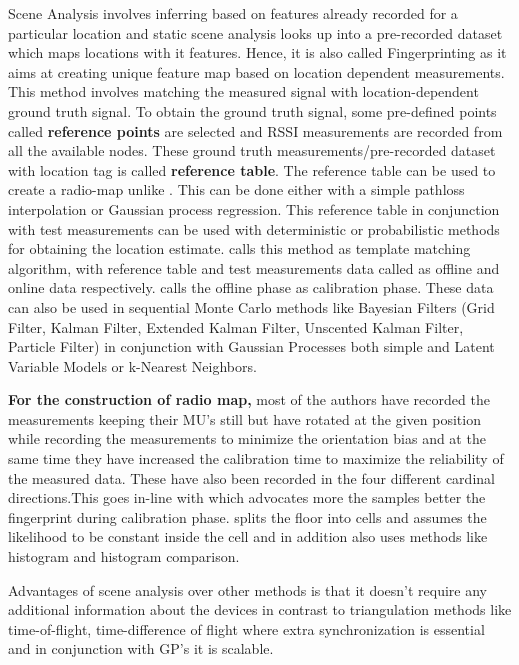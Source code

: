 Scene Analysis involves inferring based on features already recorded for a particular location and static scene analysis looks up into a pre-recorded dataset which maps locations with it features\cite{hightower}. Hence, it is also called Fingerprinting as it aims at creating unique feature map based on location dependent measurements. This method involves matching the measured signal with location-dependent ground truth signal. To obtain the ground truth signal, some pre-defined points called \textbf{reference points}  are selected and RSSI measurements are recorded from all the available nodes. These ground truth measurements/pre-recorded dataset with location tag is called \textbf{reference table}. The reference table can be used to create a radio-map unlike \cite{honkavirta}. This can be done either with a simple pathloss interpolation or Gaussian process regression.  This reference table in conjunction with test measurements can be used with deterministic or probabilistic methods for obtaining the location estimate\cite{liu}. \cite{mazzullah} calls this method as template matching algorithm, with reference table and test measurements data called as offline and online data respectively. \cite{honkavirta} calls the offline phase as calibration phase. These data can also be used in sequential Monte Carlo methods like Bayesian Filters (Grid Filter, Kalman Filter, Extended Kalman Filter, Unscented Kalman Filter, Particle Filter) in conjunction with Gaussian Processes both simple and Latent Variable Models or k-Nearest Neighbors.

\vspace{3mm}
\noindent \textbf{For the construction of radio map,} most of the authors have recorded the measurements keeping their MU's still but \cite{honkavirta} have rotated at the given position while recording the measurements to minimize the orientation bias and at the same time they have increased the calibration time to maximize the reliability of the measured data\cite{??}. These have also been recorded in the four different cardinal directions\cite{richter}.This goes in-line with \cite{??} which advocates more the samples better the fingerprint during calibration phase. \cite{honkavirta} splits the floor into cells and assumes the likelihood to be constant inside the cell and in addition also uses methods like histogram and histogram comparison.
\noindent

Advantages of scene analysis over other methods is that it doesn't require any additional information about the devices in contrast to triangulation methods like time-of-flight, time-difference of flight where extra synchronization is essential and in conjunction with GP's it is scalable\cite{hightower}.

